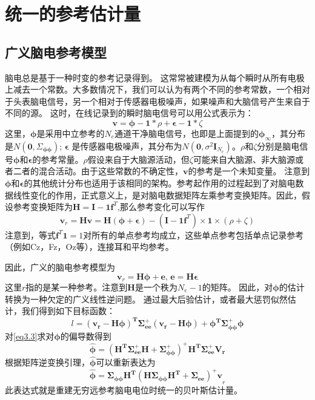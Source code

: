 \section{统一的参考估计量}
\subsection{广义脑电参考模型}
脑电总是基于一种时变的参考记录得到。 这常常被建模为从每个瞬时从所有电极上减去一个常数。大多数情况下，我们可以认为有两个不同的参考常数，一个相对于头表脑电信号，另一个相对于传感器电极噪声，如果噪声和大脑信号产生来自于不同的源。 这时，在线记录到的瞬时脑电信号可以用公式表示为：
\begin{equation}\label{eq3.1}
\mathbf{v}=\mathbf{\phi}-\mathbf{1}*\rho+\mathbf{\epsilon}-\mathbf{1}*\zeta
\end{equation}
这里，$\mathbf{\phi}$是采用中立参考的$N_{e}$通道干净脑电信号，也即是上面提到的$\mathbf{\phi}_{\infty}$，其分布是$N(\mathbf{0},\Sigma_{\mathbf{\phi}\mathbf{\phi}})$; $\mathbf{\epsilon}$ 是传感器电极噪声，其分布为$N(\mathbf{0},\sigma^{2}\mathbf{I}_{N_{e}})$。$\rho$和$\zeta$分别是脑电信号$\mathbf{\phi}$和$\mathbf{\epsilon}$的参考常量。$\rho$假设来自于大脑源活动，但$\zeta$可能来自大脑源、非大脑源或者二者的混合活动。由于这些常数的不确定性，$\mathbf{v}$的参考是一个未知变量。 注意到$\mathbf{\phi}$和$\mathbf{\epsilon}$的其他统计分布也适用于该相同的架构。参考起作用的过程起到了对脑电数据线性变化的作用，正式意义上，是对脑电数据矩阵左乘参考变换矩阵。因此，假设参考变换矩阵为$\mathbf{H=I-1f}^T$,那么参考变化可以写作
\begin{equation*}
\mathbf{v}_{r}=\mathbf{Hv}=\mathbf{H(\phi+\epsilon)}-(\mathbf{I-1f}^T)\times\mathbf{1}\times(\rho+\zeta)
\end{equation*}
注意到，等式$\mathbf{f}^T\mathbf{1}=1$对所有的单点参考均成立，这些单点参考包括单点记录参考（例如Cz，Fz，Oz等），连接耳和平均参考。

因此，广义的脑电参考模型为
\begin{equation}\label{eq3.2}
\mathbf{v}_{r}=\mathbf{H\phi+e},\,\mathbf{e=H\epsilon}
\end{equation}
这里$r$指的是某一种参考。注意到$\mathbf{H}$是一个秩为$N_{e}-1$的矩阵。 因此，对$\mathbf{\phi}$的估计转换为一种欠定的广义线性逆问题。 通过最大后验估计，或者最大惩罚似然估计，我们得到如下目标函数：
\begin{equation}\label{eq3.3}
l=\mathbf{(v_{r}-H\phi)^{T}\Sigma_{ee}^{+}(v_{r}-H\phi)+\phi^{T}\Sigma_{\phi\phi}^{+}\phi}
\end{equation}
对\eqref{eq3.3}求对$\mathbf{\phi}$的偏导数得到
\begin{equation}
\hat{\mathbf{\phi}}=\mathbf{(H^T\Sigma_{ee}^{+}H+\Sigma_{\phi\phi}^{+})^{+}H^{T}\Sigma_{ee}^{+}V_{r}}
\end{equation}
根据矩阵逆变换引理，$\hat{\mathbf{\phi}}$可以重新表达为
\begin{equation}\label{eq3.4}
\hat{\mathbf{\phi}}=\mathbf{\Sigma_{\phi\phi}H^{T}(H\Sigma_{\phi\phi}H^{T}+\Sigma_{ee})^{+}v}_{r}
\end{equation}
此表达式就是重建无穷远参考脑电电位时统一的贝叶斯估计量。

